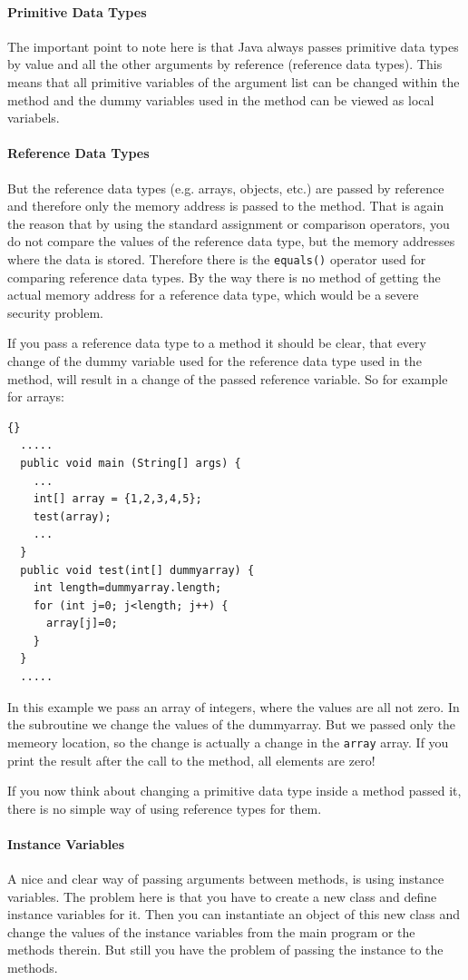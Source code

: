 \paragraph{Primitive Data Types}
The important point to note here is that Java always
passes primitive data types by value and all the other
arguments by reference (reference data types). 
This means that all primitive
variables of the argument list can be changed within
the method and the dummy variables used in the method 
can be viewed as local variabels.

\paragraph{Reference Data Types}
But the reference data types (e.g. arrays, objects, etc.)
are passed by reference and therefore only the memory
address is passed to the method. That is again the reason that
by using the standard assignment or comparison operators,
you do not compare the values of the reference data type, but
the memory addresses where the data is stored. Therefore there
is the \verb|equals()| operator used for comparing reference data
types. By the way there is no method
of getting the actual memory address for a reference data type,
which would be a severe security problem.

If you pass a reference data type to a method it should be
clear, that every change of the dummy variable used for
the reference data type used in the method, will result in a change
of the passed reference variable. So for example for arrays:
\begin{lstlisting}{}
  .....
  public void main (String[] args) {
    ...
    int[] array = {1,2,3,4,5};
    test(array);
    ...
  }
  public void test(int[] dummyarray) {
    int length=dummyarray.length;
    for (int j=0; j<length; j++) {
      array[j]=0;
    }
  }
  .....
\end{lstlisting}
In this example we pass an array of integers, where the values are all 
not zero. In the subroutine we change the values of the dummyarray.
But we passed only the memeory location, so the change is actually
a change in the \verb|array| array. If you print the result after
the call to the method, all elements are zero!

If you now think about changing a primitive data type inside a method 
passed it, there is no simple way of using reference types for 
them. 

\paragraph{Instance Variables}
A nice and clear way of passing arguments between methods, is
using instance variables. The problem here is that you have
to create a new class and define instance variables for it.
Then you can instantiate an object of this new class and
change the values of the instance variables from the main
program or the methods therein. But still you have the problem
of passing the instance to the methods.

